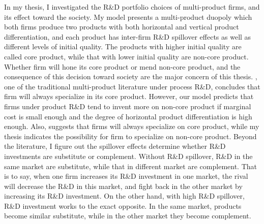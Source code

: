 \documentclass[12pt]{article}
\begin{document}
In my thesis, I investigated the R\&D portfolio choices of multi-product firms, and its effect toward the society.
My model presents a multi-product duopoly which both firms produce two products with both horizontal and vertical product differentiation, and each product has inter-firm R\&D spillover effects as well as different levels of initial quality.
The products with higher initial quality are called core product, while that with lower initial quality are non-core product.
Whether firm will hone its core product or mend non-core product, and the consequence of this decision toward society are the major concern of this thesis.
\textcite{lin_effects_2013}, one of the traditional multi-product literature under process R\&D, concludes that firm will always specialize in its core product.
However, our model predicts that firms under product R\&D tend to invent more on non-core product if marginal cost is small enough and the degree of horizontal product differentiation is high enough.
Also, \textcite{lin_effects_2013} suggests that firms will always specialize on core product, while my thesis indicates the possibility for firm to specialize on non-core product.
Beyond the literature, I figure out the spillover effects determine whether R\&D investments are substitute or complement.
Without R\&D spillover, R\&D in the same market are substitute, while that in different market are complement.
That is to say, when one firm increases its R\&D investment in one market, the rival will decrease the R\&D in this market, and fight back in the other market by increasing its R\&D investment.
On the other hand, with high R\&D spillover, R\&D investment works to the exact opposite.
In the same market, products become similar substitute, while in the other market they become complement.
\end{document}
